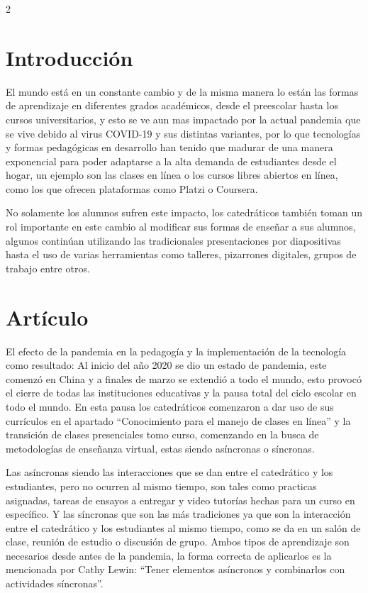 \documentclass[12pt,spanish,Letterpaper,openany]{book}
\begin{document}
\begin {multicols}{2}

\hypertarget{introducciuxf3n-5}{%
\section{Introducción}\label{introducciuxf3n-5}}

El mundo está en un constante cambio y de la misma manera lo están las formas de
aprendizaje en diferentes grados académicos, desde el preescolar hasta los cursos universitarios,
y esto se ve aun mas impactado por la actual pandemia que se vive debido al virus COVID-19 y
sus distintas variantes, por lo que tecnologías y formas pedagógicas en desarrollo han tenido que
madurar de una manera exponencial para poder adaptarse a la alta demanda de estudiantes desde
el hogar, un ejemplo son las clases en línea o los cursos libres abiertos en línea, como los que
ofrecen plataformas como Platzi o Coursera.

No solamente los alumnos sufren este impacto, los catedráticos también toman un rol
importante en este cambio al modificar sus formas de enseñar a sus alumnos, algunos continúan
utilizando las tradicionales presentaciones por diapositivas hasta el uso de varias herramientas
como talleres, pizarrones digitales, grupos de trabajo entre otros.

\hypertarget{artuxedculo-9}{%
\section{Artículo}\label{artuxedculo-9}}

El efecto de la pandemia en la pedagogía y la implementación de la tecnología como resultado:
Al inicio del año 2020 se dio un estado de pandemia, este comenzó en China y a finales
de marzo se extendió a todo el mundo, esto provocó el cierre de todas las instituciones
educativas y la pausa total del ciclo escolar en todo el mundo. En esta pausa los catedráticos
comenzaron a dar uso de sus currículos en el apartado ``Conocimiento para el manejo de clases
en línea'' y la transición de clases presenciales tomo curso, comenzando en la busca de
metodologías de enseñanza virtual, estas siendo asíncronas o síncronas.

Las asíncronas siendo las interacciones que se dan entre el catedrático y los estudiantes,
pero no ocurren al mismo tiempo, son tales como practicas asignadas, tareas de ensayos a
entregar y video tutorías hechas para un curso en específico. Y las síncronas que son las más
tradiciones ya que son la interacción entre el catedrático y los estudiantes al mismo tiempo, como
se da en un salón de clase, reunión de estudio o discusión de grupo. Ambos tipos de aprendizaje
son necesarios desde antes de la pandemia, la forma correcta de aplicarlos es la mencionada por
Cathy Lewin: ``Tener elementos asíncronos y combinarlos con actividades síncronas''.


\end{multicols}
\end{document}
